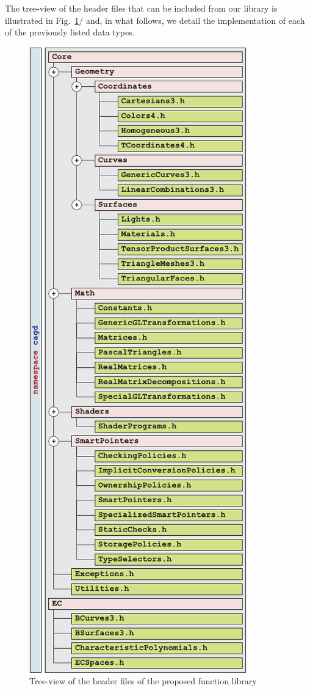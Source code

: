 \documentclass[b5paper, twosided]{book}
\DeclareRobustCommand{\mref}[1]{\ref{#1}{\relsize{-1}/\pageref{#1}}}
\begin{document}
The tree-view of the header files that can be included from our library is illustrated in Fig.\ \mref{fig:function_library_structure} and, in what follows, we detail the implementation of each of the previously listed data types.

\begin{figure}[!h]
    \centering
    \includegraphics[scale = 1.05]{images/function_library_structure_01.pdf}
    \caption{Tree-view of the header files of the proposed function library}
    \label{fig:function_library_structure}
\end{figure}
\end{document}
